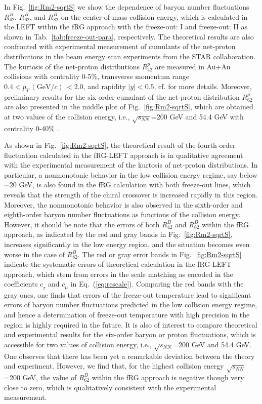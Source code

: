 \documentclass[%
reprint,
superscriptaddress,
showpacs,preprintnumbers,
 amsmath,amssymb,
 aps,
prd,
]{revtex4-1}
\def\Fig#1{Fig.~\ref{#1}} \def\Tab#1{Tab.~\ref{#1}}
\def\Eq#1{Eq.~(\ref{#1})}
\begin{document}
In \Fig{fig:Rm2-sqrtS} we show the dependence of baryon number fluctuations $R^{B}_{42}$, $R^{B}_{62}$, and $R^{B}_{82}$ on the center-of-mass collision energy, which is calculated in the LEFT within the fRG approach with the freeze-out: I and freeze-out: II as shown in \Tab{tab:freeze-out-para}, respectively. The theoretical results are also confronted with experimental measurement of cumulants of the net-proton distributions in the beam energy scan experiments from the STAR collaboration. The kurtosis of the net-proton distributions $R^{p}_{42}$ are measured in Au+Au collisions with centrality 0-5\%, transverse momentum range $0.4< p_T\,(\mathrm{GeV}/c)\,<2.0$, and rapidity $|y|<0.5$, cf. \cite{Adam:2020unf} for more details. Moreover, preliminary results for the six-order cumulant of the net-proton distribution $R^{p}_{62}$ are also presented in the middle plot of \Fig{fig:Rm2-sqrtS}, which are obtained at two values of the collision energy, i.e., $\sqrt{s_{NN}}$=200 GeV and 54.4 GeV with centrality 0-40\% \cite{Nonaka:2020crv,Pandav:2020uzx}. 

As shown in \Fig{fig:Rm2-sqrtS}, the theoretical result of the fourth-order fluctuation calculated in the fRG-LEFT approach is in qualitative agreement with the experimental measurement of the kurtosis of net-proton distributions. In particular, a nonmonotonic behavior in the low collision energy regime, say below $\sim 20$ GeV, is also found in the fRG calculation with both freeze-out lines, which reveals that the strength of the chiral crossover is increased rapidly in this region. Moreover, the nonmonotonic behavior is also observed in the sixth-order and eighth-order baryon number fluctuations as functions of the collision energy. However, it should be note that the errors of both $R^{B}_{42}$ and $R^{B}_{62}$ within the fRG approach, as indicated by the red and gray bands in \Fig{fig:Rm2-sqrtS}, increases significantly in the low energy region, and the situation becomes even worse in the case of $R^{B}_{82}$. The red or gray error bands in \Fig{fig:Rm2-sqrtS} indicate the systematic errors of theoretical calculation in the fRG-LEFT approach, which stem from errors in the scale matching as encoded in the coefficients $c_{_{T}}$ and $c_{\mu}$ in \Eq{eq:rescale}. Comparing the red bands with the gray ones, one finds that errors of the freeze-out temperature lead to significant errors of baryon number fluctuations predicted in the low collision energy regime, and hence a determination of freeze-out temperature with high precision in the region is highly required in the future. It is also of interest to compare theoretical and experimental results for the six-order baryon or proton fluctuations, which is accessible for two values of collision energy, i.e., $\sqrt{s_{NN}}$=200 GeV and 54.4 GeV. One observes that there has been yet a remarkable deviation between the theory and experiment. However, we find that, for the highest collision energy $\sqrt{s_{NN}}$=200 GeV, the value of $R^{B}_{62}$ within the fRG approach is negative though very close to zero, which is qualitatively consistent with the experimental measurement.
\end{document}
